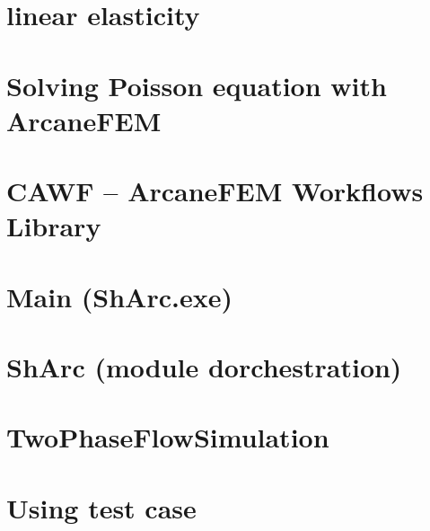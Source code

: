 \let\mypdfximage\pdfximage\def\pdfximage{\immediate\mypdfximage}\documentclass[twoside]{book}
\newcommand{\+}{\discretionary{\mbox{\scriptsize$\hookleftarrow$}}{}{}}
\begin{document}
\chapter{linear elasticity}
\label{md__work_gratienj_Projets_2026_sharc_src_CAWF_Elasticity_Readme}

\chapter{Solving Poisson equation with Arcane\+FEM}
\label{md__work_gratienj_Projets_2026_sharc_src_CAWF_Poisson_Readme}

\chapter{CAWF – Arcane\+FEM Workflows Library}
\label{md__work_gratienj_Projets_2026_sharc_src_CAWF_README}

\chapter{Main (Sh\+Arc.\+exe)}
\label{md__work_gratienj_Projets_2026_sharc_src_Main_README}

\chapter{Sh\+Arc (module d\textquotesingle{}orchestration)}
\label{md__work_gratienj_Projets_2026_sharc_src_ShArc_README}

\chapter{Two\+Phase\+Flow\+Simulation}
\label{md__work_gratienj_Projets_2026_sharc_src_TwoPhaseFlowSimulation_README}

\chapter{Using test case}
\label{md__work_gratienj_Projets_2026_sharc_test_LargeScaleTwoPhaseFlowSimulation_README}

\end{document}
